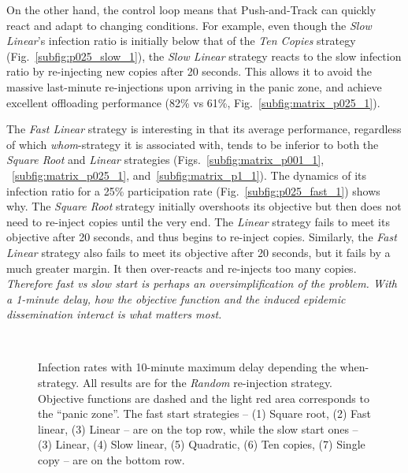 \documentclass[preprint]{elsarticle}
\begin{document}
On the other hand, the control loop means that Push-and-Track can quickly react and adapt to changing conditions. For example, even though the \textit{Slow Linear}'s infection ratio is initially below that of the \textit{Ten Copies} strategy (Fig.~\ref{subfig:p025_slow_1}), the \textit{Slow Linear} strategy reacts to the slow infection ratio by re-injecting new copies after 20 seconds. This allows it to avoid the massive last-minute re-injections upon arriving in the panic zone, and achieve excellent offloading performance (82\% vs 61\%, Fig.~\ref{subfig:matrix_p025_1}).

The \textit{Fast Linear} strategy is interesting in that its average performance, regardless of which \textit{whom}-strategy it is associated with, tends to be inferior to both the \textit{Square Root} and \textit{Linear} strategies (Figs.~\ref{subfig:matrix_p001_1}, ~\ref{subfig:matrix_p025_1}, and~\ref{subfig:matrix_p1_1}). The dynamics of its infection ratio for a 25\% participation rate (Fig.~\ref{subfig:p025_fast_1}) shows why. The \textit{Square Root} strategy initially overshoots its objective but then does not need to re-inject copies until the very end. The \textit{Linear} strategy fails to meet its objective after 20 seconds, and thus begins to re-inject copies. Similarly, the \textit{Fast Linear} strategy also fails to meet its objective after 20 seconds, but it fails by a much greater margin. It then over-reacts and re-injects too many copies. \emph{Therefore fast vs slow start is perhaps an oversimplification of the problem. With a 1-minute delay, how the objective function and the induced epidemic dissemination interact is what matters most.}

\begin{figure}[t]
  \centering
   \quad
   \quad
   \\
   \quad
   \quad
  \caption{Infection rates with 10-minute maximum delay depending the when-strategy. All results are for the \textit{Random} re-injection strategy. Objective functions are dashed and the light red area corresponds to the ``panic zone''. The fast start strategies -- (1) Square root, (2) Fast linear, (3) Linear -- are on the top row, while the slow start ones -- (3) Linear, (4) Slow linear, (5) Quadratic, (6) Ten copies, (7) Single copy -- are on the bottom row.}
  \label{fig:dynamic_10}
\end{figure}
\end{document}
